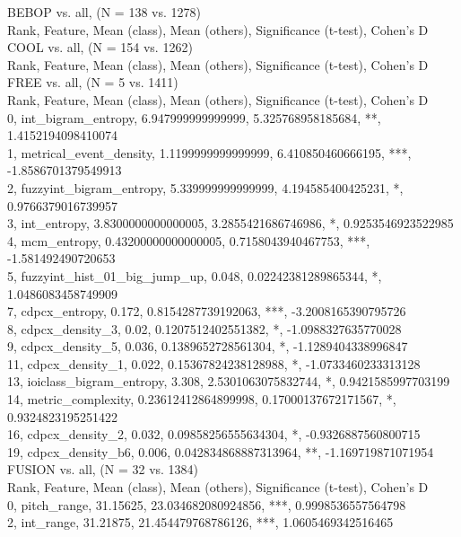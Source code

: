 BEBOP vs. all, (N = 138 vs. 1278)\\
Rank, Feature, Mean (class), Mean (others), Significance (t-test), Cohen's D\\
COOL vs. all, (N = 154 vs. 1262)\\
Rank, Feature, Mean (class), Mean (others), Significance (t-test), Cohen's D\\
FREE vs. all, (N = 5 vs. 1411)\\
Rank, Feature, Mean (class), Mean (others), Significance (t-test), Cohen's D\\
0, int_bigram_entropy, 6.947999999999999, 5.325768958185684, **, 1.4152194098410074\\
1, metrical_event_density, 1.1199999999999999, 6.410850460666195, ***, -1.8586701379549913\\
2, fuzzyint_bigram_entropy, 5.339999999999999, 4.194585400425231, *, 0.9766379016739957\\
3, int_entropy, 3.8300000000000005, 3.2855421686746986, *, 0.9253546923522985\\
4, mcm_entropy, 0.43200000000000005, 0.7158043940467753, ***, -1.581492490720653\\
5, fuzzyint_hist_01_big_jump_up, 0.048, 0.02242381289865344, *, 1.0486083458749909\\
7, cdpcx_entropy, 0.172, 0.8154287739192063, ***, -3.2008165390795726\\
8, cdpcx_density_3, 0.02, 0.1207512402551382, *, -1.0988327635770028\\
9, cdpcx_density_5, 0.036, 0.1389652728561304, *, -1.1289404338996847\\
11, cdpcx_density_1, 0.022, 0.15367824238128988, *, -1.0733460233313128\\
13, ioiclass_bigram_entropy, 3.308, 2.5301063075832744, *, 0.9421585997703199\\
14, metric_complexity, 0.23612412864899998, 0.17000137672171567, *, 0.9324823195251422\\
16, cdpcx_density_2, 0.032, 0.09858256555634304, *, -0.9326887560800715\\
19, cdpcx_density_b6, 0.006, 0.042834868887313964, **, -1.169719871071954\\
FUSION vs. all, (N = 32 vs. 1384)\\
Rank, Feature, Mean (class), Mean (others), Significance (t-test), Cohen's D\\
0, pitch_range, 31.15625, 23.034682080924856, ***, 0.9998536557564798\\
2, int_range, 31.21875, 21.454479768786126, ***, 1.0605469342516465\\
